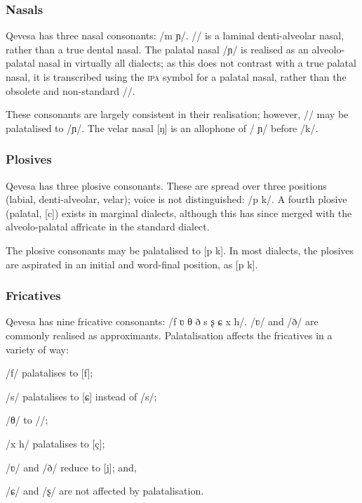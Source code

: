 \documentclass[grammar]{subfiles}
\begin{document}
	\subsubsection{Nasals}
	\label{sssec:nasals}

	Qevesa has three nasal consonants: /m  ɲ/. // is a laminal denti-alveolar nasal, rather than a true dental nasal. The palatal nasal /ɲ/ is realised as an alveolo-palatal nasal in virtually all dialects; as this does not contrast with a true palatal nasal, it is transcribed using the \textsc{ipa} symbol for a palatal nasal, rather than the obsolete and non-standard /\textctn/.

	These consonants are largely consistent in their realisation; however, // may be palatalised to /ɲ/. The velar nasal [ŋ] is an allophone of / ɲ/ before /k/.

	\subsubsection{Plosives}
	\label{sssec:plosives}

	Qevesa has three plosive consonants. These are spread over three positions (labial, denti-alveolar, velar); voice is not distinguished: /p  k/. A fourth plosive (palatal, [c]) exists in marginal dialects, although this has since merged with the alveolo-palatal affricate in the standard dialect.

	The plosive consonants may be palatalised to [p\superj{}  k\superj]. In most dialects, the plosives are aspirated in an initial and word-final position, as [p\superh{}  k\superh].

	\subsubsection{Fricatives}
	\label{sssec:fricatives}

	Qevesa has nine fricative consonants: /f ʋ θ ð s ʂ ɕ x h/. /ʋ/ and /ð/ are commonly realised as approximants. Palatalisation affects the fricatives in a variety of way: 

	\begin{itemize*}
	\item /f/ palatalises to [f\superj{}];
	\item /s/ palatalises to [ɕ] instead of /s\superj/;
	\item /θ/ to //;
	\item /x h/ palatalises to [ç];
	\item /ʋ/ and /ð/ reduce to [j]; and,
	\item /ɕ/ and /ʂ/ are not affected by palatalisation.
	\end{itemize*}
\end{document}
